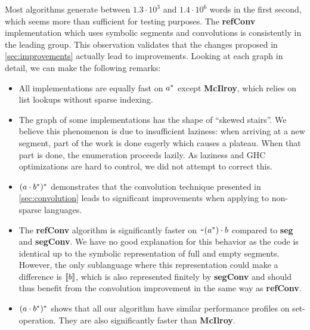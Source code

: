 Most algorithms generate between $1.3\cdot10^3$ and $1.4\cdot10^6$ words in the first
second, which seems more than sufficient for testing purposes.
The \textbf{refConv} implementation
which uses symbolic segments and convolutions is consistently in the
leading group.
This observation validates that the
changes proposed in \cref{sec:improvements} actually lead to
improvements.
%
Looking at each graph in detail, we can make the following
remarks:
\begin{itemize}[leftmargin=*]
\item All implementations are equally fast on $a^*$ except
  \textbf{McIlroy}, which relies on list lookups without
  sparse indexing.
\item The graph of some implementations
  has the shape of ``skewed stairs''. We believe this phenomenon is due to
  insufficient laziness: when arriving at a new segment, part of the
  work is done eagerly which causes a plateau. When that part is done,
  the enumeration proceeds lazily.  As laziness and GHC
  optimizations are hard to control, we did not attempt to correct this.
\item $(a \cdot{b^*})^*$ demonstrates that
  the convolution technique presented in \cref{sec:convolution}
  leads to significant improvements when applying  to non-sparse languages.
\item The \textbf{refConv} algorithm is
  significantly faster on $\texttt{\textasciitilde}{(a^*)} \cdot{b}$
  compared to \textbf{seg} and \textbf{segConv}. We have no good
  explanation for this behavior as the code is identical up to the
  symbolic representation of full and empty segments. However, the
  only sublanguage where this representation could make a difference
  is $\llbracket b\rrbracket$, which is also represented finitely by
  \textbf{segConv} and should thus benefit from the convolution
  improvement in the same way as \textbf{refConv}.
\item $(a \cdot{b^*})^*$ shows that all our algorithm have similar
  performance profiles on set-operation. They are also significantly
  faster than \textbf{McIlroy}.
\end{itemize}


